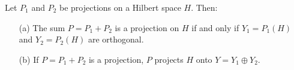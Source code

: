 \begin{theorem}\label{9.5-4}
    Let \( {P}_{1} \) and \( {P}_{2} \) be projections on a Hilbert space \( H  \). Then:
    \begin{enumerate}
    \item[(a)] The sum \( P = {P}_{1} + {P}_{2} \) is a projection on \( H  \) if and only if \( {Y}_{1} = {P}_{1}(H) \) and \( {Y}_{2} = {P}_{2}(H) \) are orthogonal.
    \item[(b)] If \( P = {P}_{1} + {P}_{2}  \) is a projection, \( P  \) projects \( H \) onto \( Y = {Y}_{1} \oplus {Y}_{2} \). 
    \end{enumerate}
\end{theorem}
